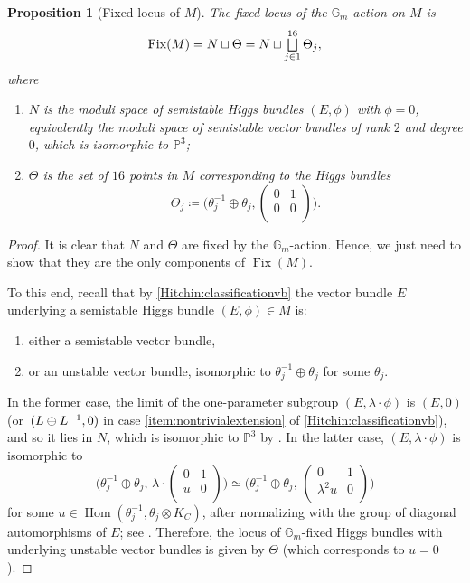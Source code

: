 \documentclass[JEP,XML,SOM,Unicode, NoEqCountersInSection,NoFloatCountersInSection,published]{cedram}
\let\oldbigsqcup\bigsqcup
\renewcommand{\bigsqcup}{\mathop{\textstyle\oldbigsqcup}\displaylimits}
\newtheorem{prop}[thm]{Proposition}
\theoremstyle{definition}
\newcommand{\Gm}{\mathbb{G}_m}
\newcommand{\PP}{\mathbb{P}}
\newcommand{\Hom}{\operatorname{Hom}}
\newcommand{\Fix}{\operatorname{Fix}}
\let\NBun N
\begin{document}
\begin{prop}[Fixed locus of $M$]\label{prop:fixedlocusM}
The fixed locus of the $\Gm$\nobreakdash-action on $M$ is\vspace*{-3pt}
\[
\Fix(M)= \NBun \sqcup \Theta = \NBun \sqcup \bigsqcup^{16}_{j \in 1} \Theta_j,
\]
where
\begin{enumerate}
\item $\NBun$ is the moduli space of semistable Higgs bundles $(E, \phi)$ with $\phi=0$, equivalently the moduli space of semistable vector bundles of rank $2$ and
degree $0$, which is isomorphic to $\PP^3$;
\item $\Theta$ is the set of $16$ points in $M$ corresponding to the Higgs bundles\vspace*{-3pt}
\[
\Theta_j \coloneqq \bigg(\theta^{-1}_j \oplus \theta_j, \begin{pmatrix}
0 & 1\\
0 & 0\\
\end{pmatrix}\bigg).
\]
\end{enumerate}
\end{prop}
\begin{proof}

It is clear that $\NBun$ and $\Theta$ are fixed by the $\Gm$\nobreakdash-action. Hence, we just need to show that they are the only components of $\Fix(M)$.

To this end, recall that by \cref{Hitchin:classificationvb} the vector bundle $E$ underlying a semistable Higgs bundle $(E, \phi) \in M$ is:
\begin{enumerate}
\item either a semistable vector bundle,
\item or an unstable vector bundle, isomorphic to $\theta^{-1}_j \oplus \theta_j$ for some $\theta_j$.
\end{enumerate}
In the former case, the limit of the one-parameter subgroup $(E, \lambda \cdot \phi)$ is $(E, 0)$ (or~$(L \oplus\nobreak L^{-1}, 0)$ in case \eqref{item:nontrivialextension} of \cref{Hitchin:classificationvb}), and so it lies in $\NBun$, which is isomorphic to $\mathbb{P}^3$ by \cite{NarasimhanRamanan69}.
In the latter case, $(E, \lambda \cdot \phi)$ is isomorphic to
\begin{equation}\label{isotropicsliceTheta}
\bigg(\theta^{-1}_j \oplus \theta_j, \,\lambda \cdot \begin{pmatrix}
0 & 1\\
u & 0\\
\end{pmatrix}\bigg) \simeq \bigg(\theta^{-1}_j \oplus \theta_j, \,\begin{pmatrix}
0 & 1\\
\lambda^2 u & 0\\
\end{pmatrix}\bigg)
\end{equation}
for some $u\in \Hom(\theta_j^{-1},\theta_j \otimes K_C)$, after normalizing with the group of diagonal automorphisms of $E$; see \cite[\S 11]{Hitchin1987}. Therefore, the locus of $\Gm$\nobreakdash-fixed Higgs bundles with underlying unstable vector bundles is given by $\Theta$ (which corresponds to $u=0$).
\end{proof}
\end{document}
